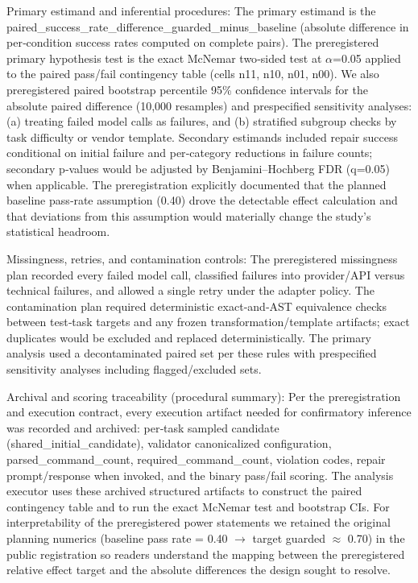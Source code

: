 \documentclass[conference]{IEEEtran}
\begin{document}
Primary estimand and inferential procedures: The primary estimand is the paired\_success\_rate\_difference\_guarded\_minus\_baseline (absolute difference in per‑condition success rates computed on complete pairs). The preregistered primary hypothesis test is the exact McNemar two‑sided test at \ensuremath{\alpha}=0.05 applied to the paired pass/fail contingency table (cells n11, n10, n01, n00). We also preregistered paired bootstrap percentile 95\% confidence intervals for the absolute paired difference (10,000 resamples) and prespecified sensitivity analyses: (a) treating failed model calls as failures, and (b) stratified subgroup checks by task difficulty or vendor template. Secondary estimands included repair success conditional on initial failure and per‑category reductions in failure counts; secondary p‑values would be adjusted by Benjamini--Hochberg FDR (q=0.05) when applicable. The preregistration explicitly documented that the planned baseline pass‑rate assumption (0.40) drove the detectable effect calculation and that deviations from this assumption would materially change the study's statistical headroom.

Missingness, retries, and contamination controls: The preregistered missingness plan recorded every failed model call, classified failures into provider/API versus technical failures, and allowed a single retry under the adapter policy. The contamination plan required deterministic exact‑and‑AST equivalence checks between test‑task targets and any frozen transformation/template artifacts; exact duplicates would be excluded and replaced deterministically. The primary analysis used a decontaminated paired set per these rules with prespecified sensitivity analyses including flagged/excluded sets.

Archival and scoring traceability (procedural summary): Per the preregistration and execution contract, every execution artifact needed for confirmatory inference was recorded and archived: per‑task sampled candidate (shared\_initial\_candidate), validator canonicalized configuration, parsed\_command\_count, required\_command\_count, violation codes, repair prompt/response when invoked, and the binary pass/fail scoring. The analysis executor uses these archived structured artifacts to construct the paired contingency table and to run the exact McNemar test and bootstrap CIs. For interpretability of the preregistered power statements we retained the original planning numerics (baseline pass rate = 0.40 \ensuremath{\rightarrow} target guarded \ensuremath{\approx} 0.70) in the public registration so readers understand the mapping between the preregistered relative effect target and the absolute differences the design sought to resolve.
\end{document}
